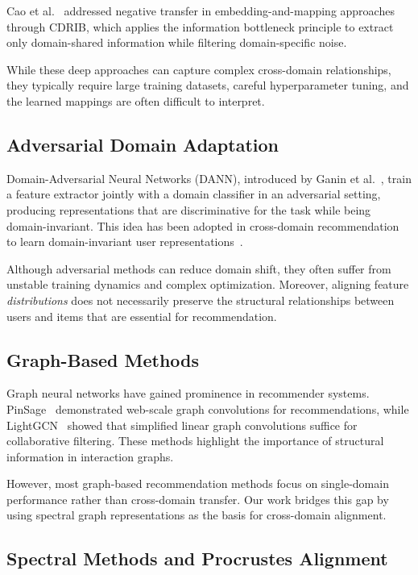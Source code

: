 \documentclass[conference]{IEEEtran}
\begin{document}
Cao et al.~\cite{cao2022} addressed negative transfer in embedding-and-mapping approaches through CDRIB, which applies the information bottleneck principle to extract only domain-shared information while filtering domain-specific noise.

While these deep approaches can capture complex cross-domain relationships, they typically require large training datasets, careful hyperparameter tuning, and the learned mappings are often difficult to interpret.

\subsection{Adversarial Domain Adaptation}

Domain-Adversarial Neural Networks (DANN), introduced by Ganin et al.~\cite{ganin2016}, train a feature extractor jointly with a domain classifier in an adversarial setting, producing representations that are discriminative for the task while being domain-invariant. This idea has been adopted in cross-domain recommendation to learn domain-invariant user representations~\cite{liu2017}.

Although adversarial methods can reduce domain shift, they often suffer from unstable training dynamics and complex optimization. Moreover, aligning feature \emph{distributions} does not necessarily preserve the structural relationships between users and items that are essential for recommendation.

\subsection{Graph-Based Methods}

Graph neural networks have gained prominence in recommender systems. PinSage~\cite{ying2018} demonstrated web-scale graph convolutions for recommendations, while LightGCN~\cite{he2020} showed that simplified linear graph convolutions suffice for collaborative filtering. These methods highlight the importance of structural information in interaction graphs.

However, most graph-based recommendation methods focus on single-domain performance rather than cross-domain transfer. Our work bridges this gap by using spectral graph representations as the basis for cross-domain alignment.

\subsection{Spectral Methods and Procrustes Alignment}
\end{document}

